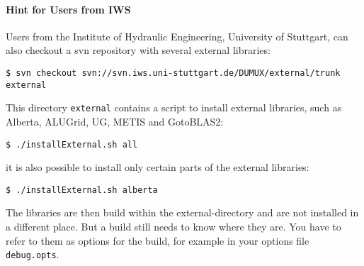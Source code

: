 \paragraph{Hint for Users from IWS} Users from the Institute of Hydraulic Engineering, University of Stuttgart,
can also checkout a svn repository with several external libraries: 

\begin{lstlisting}[style=Bash]
$ svn checkout svn://svn.iws.uni-stuttgart.de/DUMUX/external/trunk external
\end{lstlisting}

This directory \texttt{external} contains a script to install external libraries, such as 
Alberta, ALUGrid, UG, METIS and GotoBLAS2: 
\begin{lstlisting}[style=Bash]
$ ./installExternal.sh all
\end{lstlisting}
it is also possible to install only certain parts of the external libraries:
\begin{lstlisting}[style=Bash]
$ ./installExternal.sh alberta
\end{lstlisting}

The libraries are then build within the external-directory and are not installed in a different place. 
But a \Dune build still needs to know where they are. You have to refer to them as options for the \Dune build, for example in your options file \texttt{debug.opts}.

